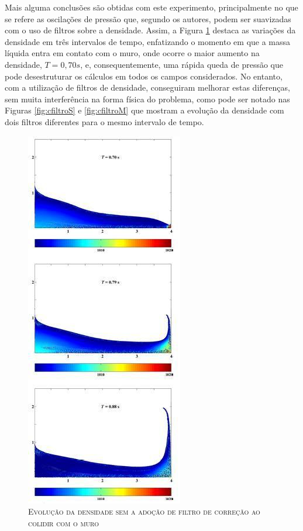 Mais alguma conclusões são obtidas com este experimento, principalmente no que se refere as oscilações de pressão que, segundo os autores, podem ser suavizadas com o uso de filtros sobre a densidade. Assim, a Figura \ref{fig:sfiltro} destaca as variações da densidade em três intervalos de tempo, enfatizando o momento em que a massa líquida entra em contato com o muro, onde ocorre o maior aumento na densidade, $T=0,70s$, e, consequentemente, uma rápida queda de pressão que pode desestruturar os cálculos em todos os campos considerados. No entanto, com a utilização de filtros de densidade, conseguiram melhorar estas diferenças, sem muita interferência na forma física do problema, como pode ser notado nas Figuras \ref{fig:cfiltroS} e \ref{fig:cfiltroM} que mostram a evolução da densidade com dois filtros diferentes para o mesmo intervalo de tempo.

\begin{figure}[H]
\centering
\includegraphics[scale=1]{figuras/sfiltro.jpg}
\caption{\textsc{Evolução da densidade sem a adoção de filtro de correção ao colidir com o muro}}
\vspace{-0.1cm}
\label{fig:sfiltro}
\end{figure}

